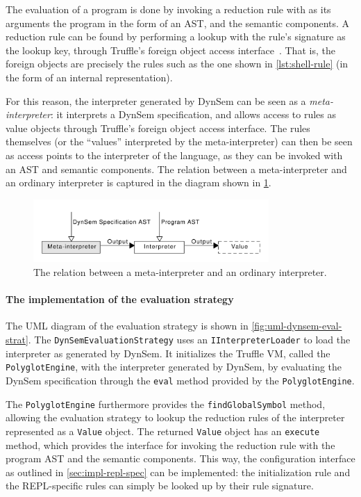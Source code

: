 The evaluation of a program is done by invoking a reduction rule with as its
arguments the program in the form of an AST, and the semantic components. A
reduction rule can be found by performing a lookup with the rule's signature as
the lookup key, through Truffle's foreign object access
interface~\cite{Grimmer15}. That is, the foreign objects are precisely the rules
such as the one shown in \cref{lst:shell-rule} (in the form of an internal
representation).

For this reason, the interpreter generated by DynSem can be seen as a
\textit{meta-interpreter}: it interprets a DynSem specification, and allows
access to rules as value objects through Truffle's foreign object access
interface. The rules themselves (or the ``values'' interpreted by the
meta-interpreter) can then be seen as access points to the interpreter of the
language, as they can be invoked with an AST and semantic components. The
relation between a meta-interpreter and an ordinary interpreter is captured in
the diagram shown in \cref{fig:meta-interpreter}.

\begin{figure}[b]
  \centering
  \includegraphics[width=0.8\textwidth]{meta-interpreter}
  \caption{The relation between a meta-interpreter and an ordinary interpreter.}
  \label{fig:meta-interpreter}
\end{figure}

\paragraph{The implementation of the evaluation strategy} The UML diagram of the
evaluation strategy is shown in \cref{fig:uml-dynsem-eval-strat}. The
\texttt{DynSemEvaluationStrategy} uses an \texttt{IInterpreterLoader} to
load the interpreter as generated by DynSem. It initializes the Truffle VM,
called the \texttt{PolyglotEngine}, with the interpreter generated by
DynSem, by evaluating the DynSem specification through the \texttt{eval} method
provided by the \texttt{PolyglotEngine}.

The \texttt{PolyglotEngine} furthermore provides the \texttt{findGlobalSymbol}
method, allowing the evaluation strategy to lookup the reduction rules of the
interpreter represented as a \texttt{Value} object. The returned
\texttt{Value} object has an \texttt{execute} method, which provides the
interface for invoking the reduction rule with the program AST and the semantic
components. This way, the configuration interface as outlined in
\cref{sec:impl-repl-spec} can be implemented: the initialization rule and the
REPL-specific rules can simply be looked up by their rule signature.


